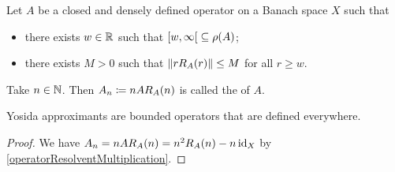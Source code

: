 \begin{definition}
Let $A$ be a closed and densely defined operator on a Banach space $X$ such that
\begin{itemize}
\item there exists $w\in \mathbb{R}$ such that $\interval[co]{w,\infty} \subseteq \res(A)$;
\item there exists $M>0$ such that $\lVert r R_A(r)\rVert\leq M$ for all $r \geq w$.
\end{itemize}
Take $n\in \mathbb{N}$. Then $A_n \coloneqq nAR_A(n)$ is called the  of $A$.
\end{definition}

\begin{lemma} \label{YosidaApproximantsBounded}
Yosida approximants are bounded operators that are defined everywhere.
\end{lemma}
\begin{proof}
We have $A_n = nAR_A(n) = n^2R_A(n) - n\operatorname{id}_X$ by \ref{operatorResolventMultiplication}.
\end{proof}

